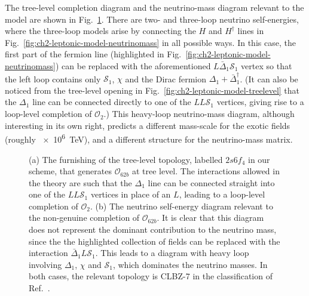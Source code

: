 The tree-level completion diagram and the neutrino-mass diagram relevant to the
model are shown in Fig.~\ref{fig:ch2-leptonic-model-diagrams}. There are two- and
three-loop neutrino self-energies, where the three-loop models arise by
connecting the $H$ and $H^{\dagger}$ lines in
Fig.~\ref{fig:ch2-leptonic-model-neutrinomass} in all possible ways. In this case,
the first part of the fermion line (highlighted in
Fig.~\ref{fig:ch2-leptonic-model-neutrinomass}) can be replaced with the
aforementioned $L\bar{\Delta}_{1}\mathcal{S}_{1}$ vertex so that the left loop
contains only $\mathcal{S}_{1}$, $\chi$ and the Dirac fermion
$\Delta_{1} + \bar{\Delta}_{1}^{\dagger}$. (It can also be noticed from the
tree-level opening in Fig.~\ref{fig:ch2-leptonic-model-treelevel} that the
$\Delta_{1}$ line can be connected directly to one of the $LL\mathcal{S}_{1}$
vertices, giving rise to a loop-level completion of $\mathcal{O}_{2}$.) This
heavy-loop neutrino-mass diagram, although interesting in its own right,
predicts a different mass-scale for the exotic fields (roughly \SI{e6}{\TeV}),
and a different structure for the neutrino-mass matrix.

\begin{figure}[t]
  \centering
  \caption[(a) The furnishing of the tree-level topology, labelled $2s6f_4$ in
  our scheme, that generates $\mathcal{O}_{62b}$ at tree level. (b) The neutrino
  self-energy diagram relevant to the non-genuine completion of
  $\mathcal{O}_{62b}$.]{(a) The furnishing of the tree-level topology, labelled
    $2s6f_4$ in our scheme, that generates $\mathcal{O}_{62b}$ at tree level.
    The interactions allowed in the theory are such that the $\Delta_{1}$ line
    can be connected straight into one of the $LL\mathcal{S}_{1}$ vertices in
    place of an $L$, leading to a loop-level completion of $\mathcal{O}_{2}$.
    (b) The neutrino self-energy diagram relevant to the non-genuine completion
    of $\mathcal{O}_{62b}$. It is clear that this diagram does not represent the
    dominant contribution to the neutrino mass, since the the highlighted
    collection of fields can be replaced with the interaction
    $\bar{\Delta}_{1} L \mathcal{S}_{1}$. This leads to a diagram with heavy
    loop involving $\Delta_{1}$, $\chi$ and $\mathcal{S}_{1}$, which dominates
    the neutrino masses. In both cases, the relevant topology is CLBZ-7 in the
    classification of Ref.~\cite{Sierra:2014rxa}.}
  \label{fig:ch2-leptonic-model-diagrams}
\end{figure}

